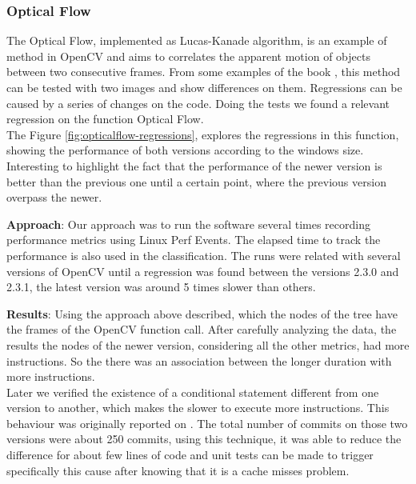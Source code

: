 \subsubsection{Optical Flow} 
The Optical Flow, implemented as Lucas-Kanade algorithm, is an example of method in OpenCV and aims to correlates the apparent motion of objects between two consecutive frames. From some examples of the book \cite{opencv2_book}, this method can be tested with two images and show differences on them. Regressions can be caused by a series of changes on the code. Doing the tests we found a relevant regression on the function Optical Flow. \\
The Figure \ref{fig:opticalflow-regressions}, explores the regressions in this function, showing the performance of both versions according to the windows size. Interesting to highlight the fact that the performance of the newer version is better than the previous one until a certain point, where the previous version overpass the newer. 

\textbf{Approach}: Our approach was to run the software several times recording performance metrics using Linux Perf Events. The elapsed time to track the performance is also used in the classification. The runs were related with several versions of OpenCV until a regression was found between the versions 2.3.0 and 2.3.1, the latest version was around 5 times slower than others.


\textbf{Results}: Using the approach above described, which the nodes of the tree have the frames of the OpenCV function call. After carefully analyzing the data, the results the nodes of the newer version, considering all the other metrics, had more instructions. So the there was an association between the longer duration with more instructions.\\
Later we verified the existence of a conditional statement different from one version to another, which makes the slower to execute more instructions. This behaviour was originally reported on \cite{regression_opencv}.
The total number of commits on those two versions were about 250 commits, using this technique, it was able to reduce the difference for about few lines of code and unit tests can be made to trigger specifically this cause after knowing that it is a cache misses problem. \\

